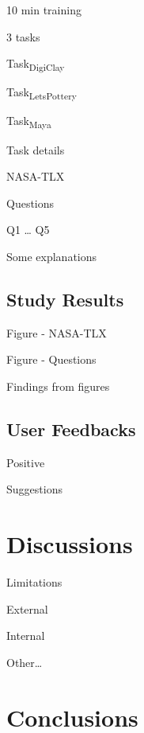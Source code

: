 10 min training

3 tasks

Task\textsubscript{DigiClay}

Task\textsubscript{LetsPottery}

Task\textsubscript{Maya}

Task details

NASA-TLX

Questions

Q1
…
Q5

Some explanations




\subsection{Study Results}
\label{sec:2}

Figure - NASA-TLX

Figure - Questions

Findings from figures


\subsection{User Feedbacks}
\label{sec:2}

Positive

Suggestions



\section{Discussions}
\label{sec:1}

Limitations

External 

Internal

Other…




\section{Conclusions}
\label{sec:1}

\cite{Cho2012Turn}



